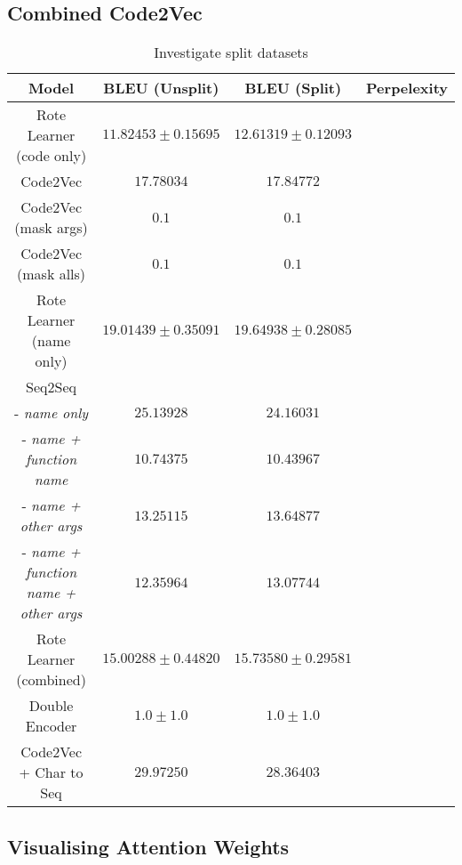 \subsection{Combined Code2Vec } %
\label{sub:combined_code2vec}


\begin{table}[h!]
\begin{center}
\begin{tabular}{ c | c | c | c }
    Model                             & BLEU (Unsplit)  & BLEU (Split)    & Perpelexity \\
    \hline
    Rote Learner  (code only)         & $ 11.82453 \pm  0.15695 $ & $ 12.61319 \pm 0.12093 $ & \\
    Code2Vec                          & $ 17.78034 $ & $ 17.84772 $ & \\
    Code2Vec  (mask args)             & $ 0.1 $ & $ 0.1$ & \\
    Code2Vec  (mask alls)             & $ 0.1 $ & $ 0.1 $ & \\
    \hline
    \hline
    Rote Learner  (name only)         & $ 19.01439 \pm  0.35091 $ & $ 19.64938 \pm 0.28085 $ & \\
    \hline
    Seq2Seq                             & &  & \\
     - \textit{name only}               & $ 25.13928 $ & $ 24.16031 $ & \\
    - \textit{name + function name}     & $ 10.74375 $ & $ 10.43967 $  \\

    - \textit{name + other args}        & $ 13.25115 $ & $ 13.64877 $  \\

    - \textit{name + function name + other args}    & $ 12.35964 $ & $ 13.07744 $  \\
    \hline
    \hline
    Rote Learner (combined)            & $ 15.00288 \pm  0.44820 $ & $ 15.73580 \pm 0.29581 $ & \\
    Double Encoder                    & $1.0 \pm 1.0 $  & $1.0 \pm 1.0 $  &  \\
    Code2Vec  + Char to Seq           & $ 29.97250 $ & $ 28.36403 $ & \\
    \hline
\end{tabular}
\caption {Investigate split datasets}
\label{table:split_datasets_embed}
\end{center}
\end{table}


\subsection{Visualising Attention Weights} %
\label{sub:visualising_attention_weights}

